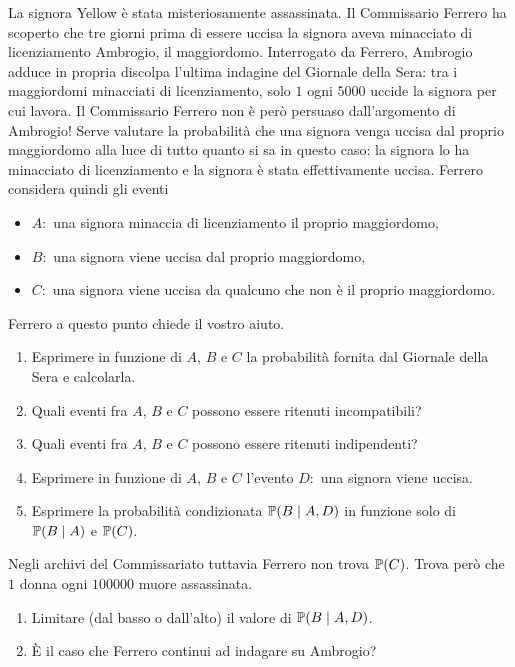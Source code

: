 La signora Yellow è stata misteriosamente assassinata. Il Commissario Ferrero ha scoperto che tre giorni prima di essere uccisa la signora aveva minacciato di licenziamento Ambrogio, il maggiordomo. Interrogato da Ferrero, Ambrogio adduce in propria discolpa l'ultima indagine del Giornale della Sera: tra i maggiordomi minacciati di licenziamento, solo $1$ ogni $5000$ uccide la signora per cui lavora. Il Commissario Ferrero non è però persuaso dall'argomento di Ambrogio! Serve valutare la probabilità che una signora venga uccisa dal proprio maggiordomo alla luce di tutto quanto si sa in questo caso: la signora lo ha minacciato di licenziamento e la signora è stata effettivamente uccisa. Ferrero considera quindi gli eventi
\begin{itemize}
	\item $A:$ una signora minaccia di licenziamento il proprio maggiordomo,
	\item $B:$ una signora viene uccisa dal proprio maggiordomo,
	\item $C:$ una signora viene uccisa da qualcuno che non è il proprio maggiordomo.
\end{itemize}
Ferrero a questo punto chiede il vostro aiuto.
\begin{enumerate}
	\item Esprimere in funzione di $A$, $B$ e $C$ la probabilità fornita dal Giornale della Sera e calcolarla.
	\item Quali eventi fra $A$, $B$ e $C$ possono essere ritenuti incompatibili?
	\item Quali eventi fra $A$, $B$ e $C$ possono essere ritenuti indipendenti?
	\item Esprimere in funzione di $A$, $B$ e $C$ l'evento $D:$ una signora viene uccisa.
	\item Esprimere la probabilità condizionata $\mathbb{P}(B\mid A,D)$ in funzione solo di $\mathbb{P}(B\mid A)$ e $\mathbb{P}(C)$.
\end{enumerate}
Negli archivi del Commissariato tuttavia Ferrero non trova $\mathbb{P}(C)$. Trova però che $1$ donna ogni $100000$ muore assassinata.
\begin{enumerate}
	\item Limitare (dal basso o dall'alto) il valore di $\mathbb{P}(B\mid A,D)$.
	\item È il caso che Ferrero continui ad indagare su Ambrogio?
\end{enumerate}



